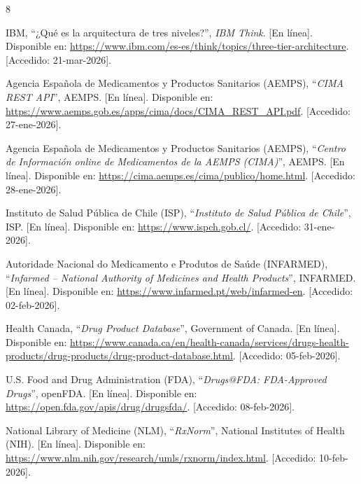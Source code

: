 \documentclass[12pt, a4paper]{report}
\begin{document}
\begin{thebibliography}{8}

IBM, ``¿Qué es la arquitectura de tres niveles?'', \textit{IBM Think}. [En línea]. Disponible en: \url{https://www.ibm.com/es-es/think/topics/three-tier-architecture}. [Accedido: 21-mar-2026].

Agencia Española de Medicamentos y Productos Sanitarios (AEMPS), ``\textit{CIMA REST API}'', AEMPS. [En línea]. Disponible en: \url{https://www.aemps.gob.es/apps/cima/docs/CIMA_REST_API.pdf}. [Accedido: 27-ene-2026].

Agencia Española de Medicamentos y Productos Sanitarios (AEMPS), ``\textit{Centro de Información online de Medicamentos de la AEMPS (CIMA)}'', AEMPS. [En línea]. Disponible en: \url{https://cima.aemps.es/cima/publico/home.html}. [Accedido: 28-ene-2026].

Instituto de Salud Pública de Chile (ISP), ``\textit{Instituto de Salud Pública de Chile}'', ISP. [En línea]. Disponible en: \url{https://www.ispch.gob.cl/}. [Accedido: 31-ene-2026].

Autoridade Nacional do Medicamento e Produtos de Saúde (INFARMED), ``\textit{Infarmed -- National Authority of Medicines and Health Products}'', INFARMED. [En línea]. Disponible en: \url{https://www.infarmed.pt/web/infarmed-en}. [Accedido: 02-feb-2026].

Health Canada, ``\textit{Drug Product Database}'', Government of Canada. [En línea]. Disponible en: \url{https://www.canada.ca/en/health-canada/services/drugs-health-products/drug-products/drug-product-database.html}. [Accedido: 05-feb-2026].

U.S. Food and Drug Administration (FDA), ``\textit{Drugs@FDA: FDA-Approved Drugs}'', openFDA. [En línea]. Disponible en: \url{https://open.fda.gov/apis/drug/drugsfda/}. [Accedido: 08-feb-2026].

National Library of Medicine (NLM), ``\textit{RxNorm}'', National Institutes of Health (NIH). [En línea]. Disponible en: \url{https://www.nlm.nih.gov/research/umls/rxnorm/index.html}. [Accedido: 10-feb-2026].

\end{thebibliography}

\end{document}
